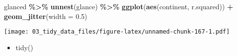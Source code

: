 \documentclass[
]{book}
\newenvironment{Shaded}{\begin{snugshade}}{\end{snugshade}}
\newcommand{\DataTypeTok}[1]{\textcolor[rgb]{0.13,0.29,0.53}{#1}}
\newcommand{\FloatTok}[1]{\textcolor[rgb]{0.00,0.00,0.81}{#1}}
\newcommand{\KeywordTok}[1]{\textcolor[rgb]{0.13,0.29,0.53}{\textbf{#1}}}
\newcommand{\NormalTok}[1]{#1}
\newcommand{\OperatorTok}[1]{\textcolor[rgb]{0.81,0.36,0.00}{\textbf{#1}}}
\newcommand{\StringTok}[1]{\textcolor[rgb]{0.31,0.60,0.02}{#1}}
\providecommand{\tightlist}{%
  \setlength{\itemsep}{0pt}\setlength{\parskip}{0pt}}
\begin{document}
\begin{Shaded}
\begin{Highlighting}[]
\NormalTok{glanced }\OperatorTok{\%\textgreater{}\%}
\StringTok{  }\KeywordTok{unnest}\NormalTok{(glance) }\OperatorTok{\%\textgreater{}\%}
\StringTok{  }\KeywordTok{ggplot}\NormalTok{(}\KeywordTok{aes}\NormalTok{(continent, r.squared)) }\OperatorTok{+}
\StringTok{  }\KeywordTok{geom\_jitter}\NormalTok{(}\DataTypeTok{width =} \FloatTok{0.5}\NormalTok{)}
\end{Highlighting}
\end{Shaded}

\texttt{[image: 03\_tidy\_data\_files/figure-latex/unnamed-chunk-167-1.pdf]}

\begin{itemize}
\tightlist
\item
  tidy()
\end{itemize}
\end{document}
